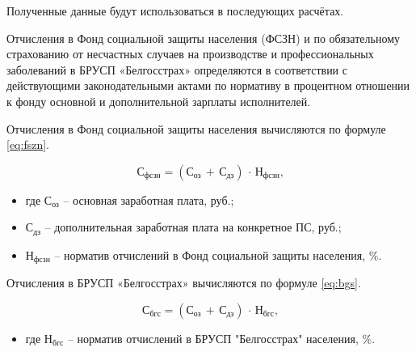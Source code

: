 Полученные данные будут использоваться в последующих расчётах.


Отчисления в Фонд социальной защиты населения (ФСЗН) и по обязательному страхованию от несчастных случаев на производстве и профессиональных заболеваний в БРУСП «Белгосстрах» определяются в соответствии с действующими законодательными актами по нормативу в процентном отношении к фонду основной и дополнительной зарплаты исполнителей.

Отчисления в Фонд социальной защиты населения вычисляются по формуле \ref{eq:fszn}.

\noindent
\begin{minipage}{1\linewidth}
\begin{equation}\label{eq:fszn}
  \text{С}_\text{фсзн} = (\text{С}_\text{оз}\,+\,\text{С}_\text{дз})\,\cdot\,\text{Н}_\text{фсзн}\text{,}
\end{equation}
\begin{itemize}[nosep, leftmargin=0pt, labelindent=0pt, itemsep=0pt, parsep=0pt]
  \item[] где $\text{С}_\text{оз}$ -- основная заработная плата, руб.;
  \item[] \hspace*{12.5mm}$\text{С}_\text{дз}$ -- дополнительная заработная плата на конкретное ПС, руб.;
  \item[] \hspace*{12.5mm}$\text{Н}_\text{фсзн}$ -- норматив отчислений в Фонд социальной защиты населения, \%.
\end{itemize}
\end{minipage}

Отчисления в БРУСП «Белгосстрах» вычисляются по формуле \ref{eq:bgs}.

\noindent
\begin{minipage}{1\linewidth}
\begin{equation}\label{eq:bgs}
  \text{С}_\text{бгс} = (\text{С}_\text{оз}\,+\,\text{С}_\text{дз})\,\cdot\,\text{Н}_\text{бгс}\text{,}
\end{equation}
\begin{itemize}[nosep, leftmargin=0pt, labelindent=0pt, itemsep=0pt, parsep=0pt]
  \item[] где $\text{Н}_\text{бгс}$ -- норматив отчислений в БРУСП "Белгосстрах" населения, \%.
\end{itemize}
\end{minipage}

